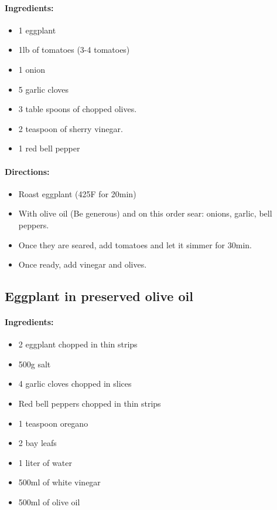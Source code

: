 \documentclass{article}
\begin{document}
\paragraph{Ingredients:}
\begin{itemize}
    \item 1 eggplant
    \item 1lb of tomatoes (3-4 tomatoes)
    \item 1 onion
    \item 5 garlic cloves
    \item 3 table spoons of chopped olives.
    \item 2 teaspoon of sherry vinegar.
    \item 1 red bell pepper
\end{itemize}

\paragraph{Directions:}
\begin{itemize}
    \item Roast eggplant (425F for 20min)
    \item With olive oil (Be generous) and on this order sear: onions, garlic, bell peppers.
    \item Once they are seared, add tomatoes and let it simmer for 30min.
    \item Once ready, add vinegar and olives.
\end{itemize}

\subsection{Eggplant in preserved olive oil}

\paragraph{Ingredients:}
\begin{itemize}
    \item 2 eggplant chopped in thin strips
    \item 500g salt
    \item 4 garlic cloves chopped in slices
    \item Red bell peppers chopped in thin strips
    \item 1 teaspoon oregano
    \item 2 bay leafs
    \item 1 liter of water
    \item 500ml of white vinegar
    \item 500ml of olive oil
\end{itemize}
\end{document}
